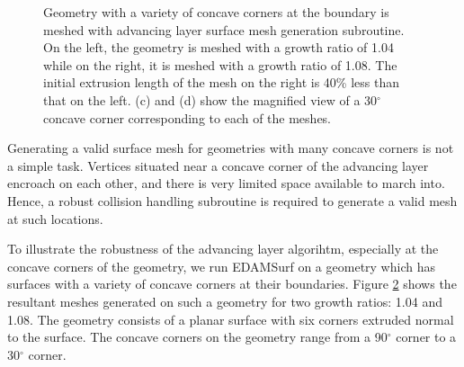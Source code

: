 \begin{figure}
\begin{subfigure}{0.5\textwidth}
		\caption{}
		\label{fig-variousAngle-corner-high}
	\end{subfigure}
	\caption{Geometry with a variety of concave corners at the boundary is meshed with advancing layer surface mesh generation subroutine. On the left, the geometry is meshed with a growth ratio of 1.04 while on the right, it is meshed with a growth ratio of 1.08. The initial extrusion length of the mesh on the right is 40\% less than that on the left. (c) and (d) show the magnified view of a 30$^\circ$ concave corner corresponding to each of the meshes.}
	\label{fig-variousAngle}
\end{figure}

Generating a valid surface mesh for geometries with many concave corners is not a simple task. Vertices situated near a concave corner of the advancing layer encroach on each other, and there is very limited space available to march into. Hence, a robust collision handling subroutine is required to generate a valid mesh at such locations.

To illustrate the robustness of the advancing layer algorihtm, especially at the concave corners of the geometry, we run EDAMSurf on a geometry which has surfaces with a variety of concave corners at their boundaries. Figure \ref{fig-variousAngle} shows the resultant meshes generated on such a geometry for two growth ratios: 1.04 and 1.08. The geometry consists of a planar surface with six corners extruded normal to the surface. The concave corners on the geometry range from a 90$^\circ$ corner to a 30$^\circ$ corner.

